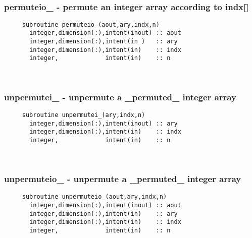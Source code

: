 \mbox{}\hrulefill\ 
 

  \subsubsection{permuteio\_ - permute an integer array according to indx[]}

\begin{verbatim} 
     subroutine permuteio_(aout,ary,indx,n)
       integer,dimension(:),intent(inout) :: aout
       integer,dimension(:),intent(in )   :: ary
       integer,dimension(:),intent(in)    :: indx
       integer,             intent(in)    :: n
 \end{verbatim}%
 
 
\mbox{}\hrulefill\ 
 

  \subsubsection{unpermutei\_ - unpermute a \_permuted\_ integer array}

\begin{verbatim} 
     subroutine unpermutei_(ary,indx,n)
       integer,dimension(:),intent(inout) :: ary
       integer,dimension(:),intent(in)    :: indx
       integer,             intent(in)    :: n
 \end{verbatim}%
 
 
\mbox{}\hrulefill\ 
 

  \subsubsection{unpermuteio\_ - unpermute a \_permuted\_ integer array}

\begin{verbatim} 
     subroutine unpermuteio_(aout,ary,indx,n)
       integer,dimension(:),intent(inout) :: aout
       integer,dimension(:),intent(in)    :: ary
       integer,dimension(:),intent(in)    :: indx
       integer,             intent(in)    :: n
 \end{verbatim}%
 
